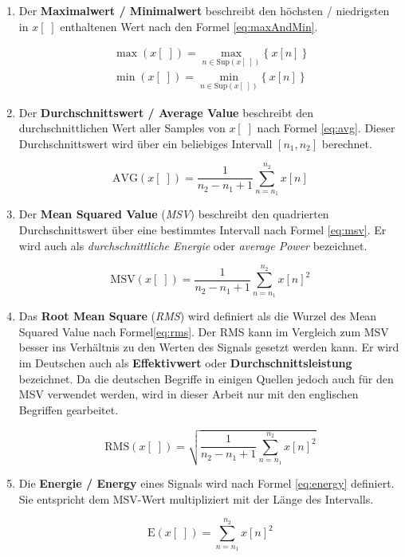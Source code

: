 \begin{enumerate}[leftmargin=*]
	
	\item Der \textbf{Maximalwert / Minimalwert} beschreibt den höchsten / niedrigsten in  $x[\;]$ enthaltenen Wert nach den Formel \ref{eq:maxAndMin}.
	
	\begin{equation}
	\begin{gathered}
	\max(x[\;]) = \max\limits_{n \in \text{Sup}(x[\;]) }\{\ x[n]\ \} \\ 
	\min(x[\;])= \min\limits_{n \in \text{Sup}(x[\;])}\{\ x[n]\ \}
	\end{gathered}
	\label{eq:maxAndMin}
	\end{equation}
	
	
	\item Der \textbf{Durchschnittswert / Average Value} beschreibt den durchschnittlichen Wert aller Samples von $x[\;]$ nach Formel \ref{eq:avg}. Dieser Durchschnittswert wird über ein beliebiges Intervall $[n_1, n_2]$ berechnet.
	
	\begin{equation}
	\text{AVG}(x[\;]) = \frac{1}{n_2 - n_1 + 1} \sum_{n = n_1}^{n_2} x[n]
	\label{eq:avg}
	\end{equation}
	
	\item Der \textbf{Mean Squared Value} (\emph{MSV}) beschreibt den quadrierten Durchschnittswert über eine bestimmtes Intervall nach Formel \ref{eq:msv}. Er wird auch als \emph{durchschnittliche Energie} oder \emph{average Power} bezeichnet.
	
	\begin{equation}
	\text{MSV}(x[\;]) = \frac{1}{n_2 - n_1 + 1} \sum_{n = n_1}^{n_2} x[n]^2
	\label{eq:msv}
	\end{equation}
	
	\item Das \textbf{Root Mean Square} (\emph{RMS}) wird definiert als die Wurzel des Mean Squared Value nach Formel\ref{eq:rms}. Der RMS kann im Vergleich zum MSV besser ins Verhältnis zu den Werten des Signals gesetzt werden kann. Er wird im Deutschen auch als \textbf{Effektivwert} oder \textbf{Durchschnittsleistung} bezeichnet. Da die deutschen Begriffe in einigen Quellen jedoch auch für den MSV verwendet werden, wird in dieser Arbeit nur mit den englischen Begriffen gearbeitet.
	
	\begin{equation}
	\text{RMS}(x[\;]) = \sqrt{\frac{1}{n_2 - n_1 + 1} \sum_{n = n_1}^{n_2} x[n]^2}
	\label{eq:rms}
	\end{equation}
	
	\item Die \textbf{Energie / Energy} eines Signals wird nach Formel \ref{eq:energy} definiert. Sie entspricht dem MSV-Wert multipliziert mit der Länge des Intervalls. \cite[S. 27-28]{dspMichigan}
	
	\begin{equation}
	\text{E}(x[\;]) = \sum_{n = n_1}^{n_2} x[n]^2
	\label{eq:energy}
	\end{equation}
	
\end{enumerate}	


